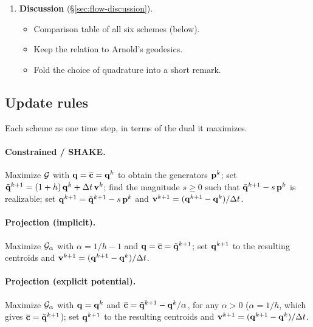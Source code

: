 \documentclass[main.tex]{subfiles}
\begin{document}
\begin{enumerate}
\begin{itemize}
      \item The velocity update is a pressure projection rather than the position difference.
      \item Keep the current three-paragraph reading, reframed around the table above.
    \end{itemize}
  \item \textbf{Discussion} (\S\ref{sec:flow-discussion}).
    \begin{itemize}
      \item Comparison table of all six schemes (below).
      \item Keep the relation to Arnold's geodesics.
      \item Fold the choice of quadrature into a short remark.
    \end{itemize}
\end{enumerate}

\subsection*{Update rules}

Each scheme as one time step, in terms of the dual it maximizes.

\paragraph{Constrained / SHAKE.}
Maximize $\mathcal{G}$ with $\mathbf{q} = \overline{\mathbf{c}} = \mathbf{q}^k$ to obtain the generators $\mathbf{p}^k$; set $\tilde{\mathbf{q}}^{k+1} = (1 + h)\,\mathbf{q}^k + \Delta t\,\mathbf{v}^k$; find the magnitude $s \ge 0$ such that $\tilde{\mathbf{q}}^{k+1} - s\,\mathbf{p}^k$ is realizable; set $\mathbf{q}^{k+1} = \tilde{\mathbf{q}}^{k+1} - s\,\mathbf{p}^k$ and $\mathbf{v}^{k+1} = (\mathbf{q}^{k+1} - \mathbf{q}^k)/\Delta t$.

\paragraph{Projection (implicit).}
Maximize $\mathcal{G}_\alpha$ with $\alpha = 1/h - 1$ and $\mathbf{q} = \overline{\mathbf{c}} = \tilde{\mathbf{q}}^{k+1}$; set $\mathbf{q}^{k+1}$ to the resulting centroids and $\mathbf{v}^{k+1} = (\mathbf{q}^{k+1} - \mathbf{q}^k)/\Delta t$.

\paragraph{Projection (explicit potential).}
Maximize $\mathcal{G}_\alpha$ with $\mathbf{q} = \mathbf{q}^k$ and $\overline{\mathbf{c}} = \tilde{\mathbf{q}}^{k+1} - \mathbf{q}^k/\alpha$, for any $\alpha > 0$ (\eg $\alpha = 1/h$, which gives $\overline{\mathbf{c}} = \tilde{\mathbf{q}}^{k+1}$); set $\mathbf{q}^{k+1}$ to the resulting centroids and $\mathbf{v}^{k+1} = (\mathbf{q}^{k+1} - \mathbf{q}^k)/\Delta t$.
\end{document}
